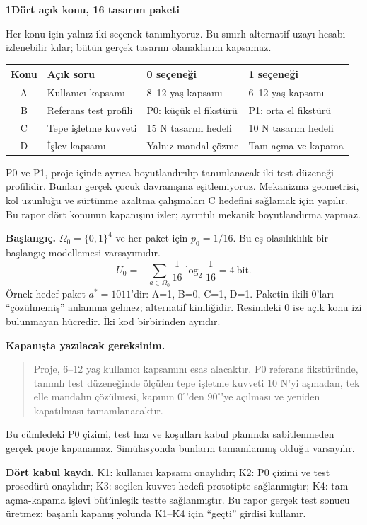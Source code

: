 \documentclass[11pt,a4paper]{article}
\newcommand{\heading}[2]{{\sffamily\small\color{blue!40!black}#1}\par{\sffamily\LARGE\bfseries#2}\par\vspace{3mm}}
\newcommand{\page}[2]{\newpage\heading{#1}{#2}}
\begin{document}
\page{Ortak örnek proje}{1\quad Dört açık konu, 16 tasarım paketi}
Her konu için yalnız iki seçenek tanımlıyoruz. Bu sınırlı alternatif uzayı
hesabı izlenebilir kılar; bütün gerçek tasarım olanaklarını kapsamaz.
\begin{center}\small\begin{tabular}{c p{40mm} p{43mm} p{43mm}}\toprule
Konu & Açık soru & 0 seçeneği & 1 seçeneği\\\midrule
A & Kullanıcı kapsamı & 8--12 yaş kapsamı & 6--12 yaş kapsamı\\
B & Referans test profili & P0: küçük el fikstürü & P1: orta el fikstürü\\
C & Tepe işletme kuvveti & 15 N tasarım hedefi & 10 N tasarım hedefi\\
D & İşlev kapsamı & Yalnız mandal çözme & Tam açma ve kapama\\\bottomrule
\end{tabular}\end{center}
P0 ve P1, proje içinde ayrıca boyutlandırılıp tanımlanacak iki test düzeneği
profilidir. Bunları gerçek çocuk davranışına eşitlemiyoruz. Mekanizma geometrisi,
kol uzunluğu ve sürtünme azaltma çalışmaları C hedefini sağlamak için yapılır.
Bu rapor dört konunun kapanışını izler; ayrıntılı mekanik boyutlandırma yapmaz.

\textbf{Başlangıç.} $\Omega_0=\{0,1\}^4$ ve her paket için $p_0=1/16$.
Bu eş olasılıklılık bir başlangıç modellemesi varsayımıdır.
\[
U_0=-\sum_{a\in\Omega_0}\frac1{16}\log_2\frac1{16}=4\ \text{bit}.
\]
Örnek hedef paket $a^*=1011$'dir: A=1, B=0, C=1, D=1.
Paketin ikili 0'ları ``çözülmemiş'' anlamına gelmez; alternatif kimliğidir.
Resimdeki 0 ise açık konu izi bulunmayan hücredir. İki kod birbirinden ayrıdır.

\textbf{Kapanışta yazılacak gereksinim.}
\begin{quote}
Proje, 6--12 yaş kullanıcı kapsamını esas alacaktır. P0 referans fikstüründe,
tanımlı test düzeneğinde ölçülen tepe işletme kuvveti 10 N'yi aşmadan,
tek elle mandalın çözülmesi, kapının $0^\circ$'den $90^\circ$'ye açılması
ve yeniden kapatılması tamamlanacaktır.
\end{quote}
Bu cümledeki P0 çizimi, test hızı ve koşulları kabul planında sabitlenmeden
gerçek proje kapanamaz. Simülasyonda bunların tamamlanmış olduğu varsayılır.

\textbf{Dört kabul kaydı.} K1: kullanıcı kapsamı onaylıdır; K2: P0 çizimi ve
test prosedürü onaylıdır; K3: seçilen kuvvet hedefi prototipte sağlanmıştır;
K4: tam açma-kapama işlevi bütünleşik testte sağlanmıştır. Bu rapor gerçek
test sonucu üretmez; başarılı kapanış yolunda K1--K4 için ``geçti'' girdisi kullanır.
\end{document}

